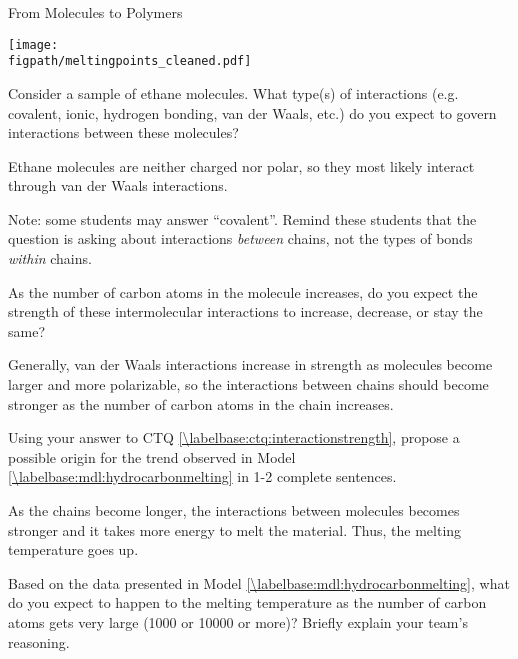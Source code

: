 \begin{activity}{From Molecules to Polymers}
\begin{model}
	\centerline{\texttt{[image: \\figpath/meltingpoints\_cleaned.pdf]}}
	
	\vspace{6pt}

\end{model}

\begin{ctqs}
	
	\question Consider a sample of ethane molecules.  What type(s) of interactions (e.g. covalent, ionic, hydrogen bonding, van der Waals, etc.) do you expect to govern interactions between these molecules?%
	
		\begin{solution}[0.5in]{}
			Ethane molecules are neither charged nor polar, so they most likely interact through van der Waals interactions.
			
			Note: some students may answer ``covalent''.  Remind these students that the question is asking about interactions \emph{between} chains, not the types of bonds \emph{within} chains.
		\end{solution}
	
	\question As the number of carbon atoms in the molecule increases, do you expect the strength of these intermolecular interactions to increase, decrease, or stay the same? \label{\labelbase:ctq:interactionstrength}
	
		\begin{solution}[0.5in]{}
			Generally, van der Waals interactions increase in strength as molecules become larger and more polarizable, so the interactions between chains should become stronger as the number of carbon atoms in the chain increases.
		\end{solution}
	
	\question Using your answer to CTQ \ref{\labelbase:ctq:interactionstrength}, propose a possible origin for the trend observed in Model \ref{\labelbase:mdl:hydrocarbonmelting} in 1-2 complete sentences.
	
		\begin{solution}[1.9in]{}
			As the chains become longer, the interactions between molecules becomes stronger and it takes more energy to melt the material.  Thus, the melting temperature goes up.
		\end{solution}
	\question Based on the data presented in Model \ref{\labelbase:mdl:hydrocarbonmelting}, what do you expect to happen to the melting temperature as the number of carbon atoms gets very large (1000 or 10000 or more)?  Briefly explain your team's reasoning.
	

\end{ctqs}
\end{activity}
